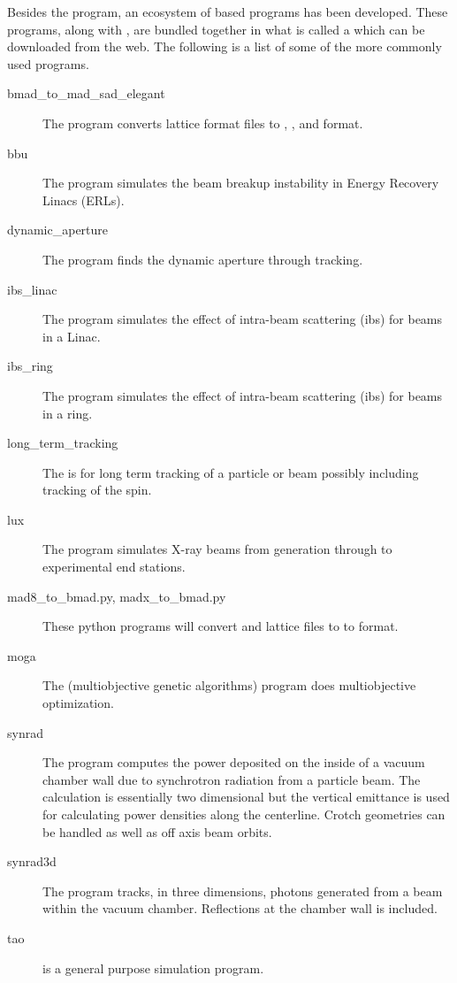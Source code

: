 Besides the \tao program, an ecosystem of \bmad based programs has been developed. These programs,
along with \bmad, are bundled together in what is called a \bmad {} which can be
downloaded from the web. The following is a list of some of the more commonly used programs.
  \begin{description}
%
  \item[bmad_to_mad_sad_elegant] \Newline
The  program converts \bmad lattice format files to ,
,  and  format.
%
  \item[bbu] \Newline
The  program simulates the beam breakup instability in Energy Recovery Linacs (ERLs). 
%
  \item[dynamic_aperture] \Newline
The  program finds the dynamic aperture through tracking.
%
  \item[ibs_linac] \Newline
The  program simulates the effect of intra-beam scattering (ibs) for beams in a Linac.
%
  \item[ibs_ring] \Newline
The  program simulates the effect of intra-beam scattering (ibs) for beams
in a ring.
%
  \item[long_term_tracking] \Newline
The  is for long term tracking of a particle or beam possibly
including tracking of the spin.
%
  \item[lux] \Newline
The  program simulates X-ray beams from generation through to experimental end stations.
%
  \item[mad8_to_bmad.py, madx_to_bmad.py] \Newline
These python programs will convert  and  lattice files to to \bmad format. 
%
  \item[moga] \Newline
The  (multiobjective genetic algorithms) program does multiobjective optimization.
%
  \item[synrad] \Newline
The  program computes the power deposited on the inside of a vacuum chamber
wall due to synchrotron radiation from a particle beam. The calculation is essentially two
dimensional but the vertical emittance is used for calculating power densities along the
centerline. Crotch geometries can be handled as well as off axis beam orbits. 
%
  \item[synrad3d] \Newline
The  program tracks, in three dimensions, photons generated from a beam
within the vacuum chamber. Reflections at the chamber wall is included.
%
  \item[tao] \Newline
\tao is a general purpose simulation program.
  \end{description}

